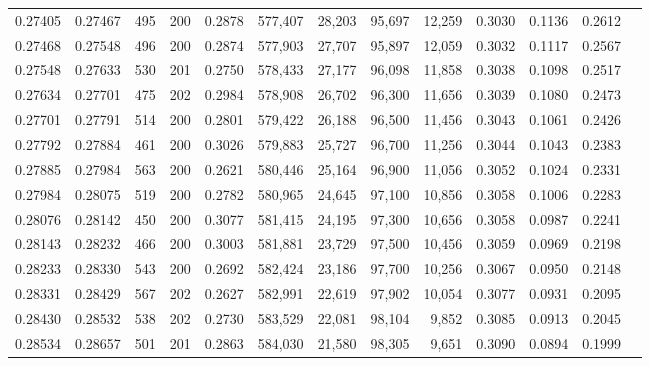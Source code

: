 \begin{tabular}{rrrrrrrrrrrrr}
0.27405 & 0.27467 &   495 & 200 &                                     0.2878 & 577,407 &  28,203 &  95,697 &  12,259 & 0.3030 & 0.1136 & 0.2612 \\
0.27468 & 0.27548 &   496 & 200 &                                     0.2874 & 577,903 &  27,707 &  95,897 &  12,059 & 0.3032 & 0.1117 & 0.2567 \\
0.27548 & 0.27633 &   530 & 201 &                                     0.2750 & 578,433 &  27,177 &  96,098 &  11,858 & 0.3038 & 0.1098 & 0.2517 \\
0.27634 & 0.27701 &   475 & 202 &                                     0.2984 & 578,908 &  26,702 &  96,300 &  11,656 & 0.3039 & 0.1080 & 0.2473 \\
0.27701 & 0.27791 &   514 & 200 &                                     0.2801 & 579,422 &  26,188 &  96,500 &  11,456 & 0.3043 & 0.1061 & 0.2426 \\
0.27792 & 0.27884 &   461 & 200 &                                     0.3026 & 579,883 &  25,727 &  96,700 &  11,256 & 0.3044 & 0.1043 & 0.2383 \\
0.27885 & 0.27984 &   563 & 200 &                                     0.2621 & 580,446 &  25,164 &  96,900 &  11,056 & 0.3052 & 0.1024 & 0.2331 \\
0.27984 & 0.28075 &   519 & 200 &                                     0.2782 & 580,965 &  24,645 &  97,100 &  10,856 & 0.3058 & 0.1006 & 0.2283 \\
0.28076 & 0.28142 &   450 & 200 &                                     0.3077 & 581,415 &  24,195 &  97,300 &  10,656 & 0.3058 & 0.0987 & 0.2241 \\
0.28143 & 0.28232 &   466 & 200 &                                     0.3003 & 581,881 &  23,729 &  97,500 &  10,456 & 0.3059 & 0.0969 & 0.2198 \\
0.28233 & 0.28330 &   543 & 200 &                                     0.2692 & 582,424 &  23,186 &  97,700 &  10,256 & 0.3067 & 0.0950 & 0.2148 \\
0.28331 & 0.28429 &   567 & 202 &                                     0.2627 & 582,991 &  22,619 &  97,902 &  10,054 & 0.3077 & 0.0931 & 0.2095 \\
0.28430 & 0.28532 &   538 & 202 &                                     0.2730 & 583,529 &  22,081 &  98,104 &   9,852 & 0.3085 & 0.0913 & 0.2045 \\
0.28534 & 0.28657 &   501 & 201 &                                     0.2863 & 584,030 &  21,580 &  98,305 &   9,651 & 0.3090 & 0.0894 & 0.1999 \\

\end{tabular}
